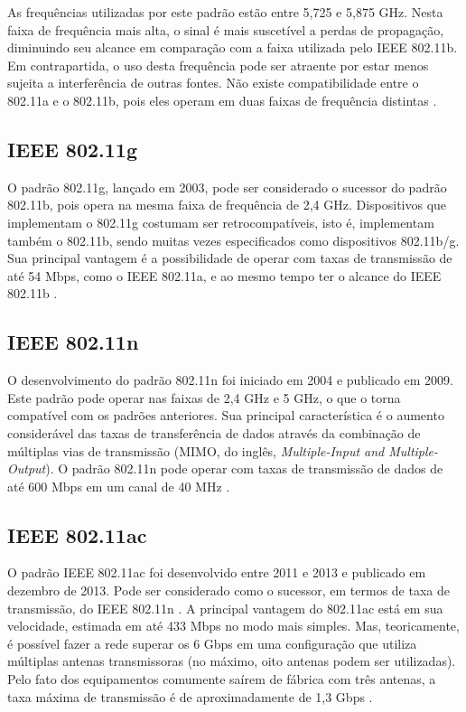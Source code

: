 As frequências utilizadas por este padrão estão entre 5,725 e 5,875 GHz. Nesta faixa de frequência mais alta, o sinal é mais suscetível a perdas de propagação, diminuindo seu alcance em comparação com a faixa utilizada pelo IEEE 802.11b. Em contrapartida, o uso desta frequência pode ser atraente por estar menos sujeita a interferência de outras fontes. Não existe compatibilidade entre o 802.11a e o 802.11b, pois eles operam em duas faixas de frequência distintas \cite{moraes2010,fluminense2010}.

\subsection{IEEE 802.11g}
\label{802-11g}

O padrão 802.11g, lançado em 2003, pode ser considerado o sucessor do padrão 802.11b, pois opera na mesma faixa de frequência de 2,4 GHz. Dispositivos que implementam o 802.11g costumam ser retrocompatíveis, isto é, implementam também o 802.11b, sendo muitas vezes especificados como dispositivos 802.11b/g. Sua principal vantagem é a possibilidade de operar com taxas de transmissão de até 54 Mbps, como o IEEE 802.11a, e ao mesmo tempo ter o alcance do IEEE 802.11b \cite{moraes2010,fluminense2010}.

\subsection{IEEE 802.11n}
\label{802-11n}

O desenvolvimento do padrão 802.11n foi iniciado em 2004 e publicado em 2009. Este padrão pode operar nas faixas de 2,4 GHz e 5 GHz, o que o torna compatível com os padrões anteriores. Sua principal característica é o aumento considerável das taxas de transferência de dados através da combinação de múltiplas vias de transmissão (MIMO, do inglês, \textit{Multiple-Input and Multiple-Output}). O padrão 802.11n pode operar com taxas de transmissão de dados de até 600 Mbps em um canal de 40 MHz \cite{moraes2010}.

\subsection{IEEE 802.11ac}
\label{802-11ac}

O padrão IEEE 802.11ac foi desenvolvido entre 2011 e 2013 e publicado em dezembro de 2013. Pode ser considerado como o sucessor, em termos de taxa de transmissão, do IEEE 802.11n \cite{alecrim2008site}.
A principal vantagem do 802.11ac está em sua velocidade, estimada em até 433 Mbps no modo mais simples. Mas, teoricamente, é possível fazer a rede superar os 6 Gbps em uma configuração que utiliza múltiplas antenas transmissoras (no máximo, oito antenas podem ser utilizadas). Pelo fato dos equipamentos comumente saírem de fábrica com três antenas, a taxa máxima de transmissão é de aproximadamente de 1,3 Gbps \cite{alecrim2008site}.

